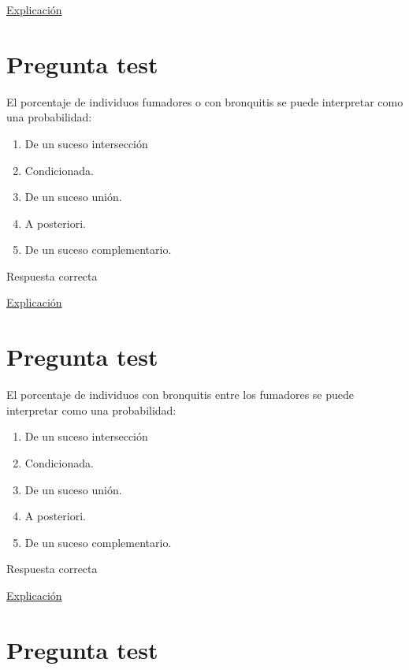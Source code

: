 \documentclass[
]{book}
\providecommand{\tightlist}{%
  \setlength{\itemsep}{0pt}\setlength{\parskip}{0pt}}
\begin{document}
\href{https://es.wikipedia.org/wiki/Riesgo_atribuible}{Explicación}

\hypertarget{pregunta-test-167}{%
\section{Pregunta test}\label{pregunta-test-167}}

El porcentaje de individuos fumadores o con bronquitis se puede interpretar como una probabilidad:

\begin{enumerate}
\def\labelenumi{\alph{enumi})}
\tightlist
\item
  De un suceso intersección
\item
  Condicionada.
\item
  De un suceso unión.
\item
  A posteriori.
\item
  De un suceso complementario.
\end{enumerate}

Respuesta correcta

\href{https://www.um.es/documents/4874468/11785083/tema-4.pdf/6d391656-5f98-49e4-b8b7-1d8d38767b7e}{Explicación}

\hypertarget{pregunta-test-168}{%
\section{Pregunta test}\label{pregunta-test-168}}

El porcentaje de individuos con bronquitis entre los fumadores se puede interpretar como una probabilidad:

\begin{enumerate}
\def\labelenumi{\alph{enumi})}
\tightlist
\item
  De un suceso intersección
\item
  Condicionada.
\item
  De un suceso unión.
\item
  A posteriori.
\item
  De un suceso complementario.
\end{enumerate}

Respuesta correcta

\href{https://es.wikipedia.org/wiki/Probabilidad_condicionada}{Explicación}

\hypertarget{pregunta-test-169}{%
\section{Pregunta test}\label{pregunta-test-169}}
\end{document}
